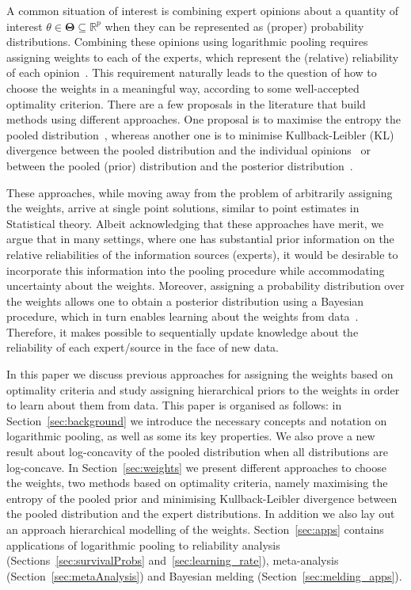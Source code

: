 \documentclass[a4paper, notitlepage, 10pt]{article}
\begin{document}
A common situation of interest is combining expert opinions about a quantity of interest $\theta \in \mathbf{\Theta} \subseteq \mathbb{R}^p$ when they can be represented as (proper) probability distributions.
Combining these opinions using logarithmic pooling requires assigning weights to each of the experts, which represent the (relative) reliability of each opinion~\citep{Genest1984}.
This requirement naturally leads to the question of how to choose the weights in a meaningful way, according to some well-accepted optimality criterion.
There are a few proposals in the literature that build methods using different approaches.
One proposal is to maximise the entropy the pooled distribution~\citep{Myung1996}, whereas another one is to minimise Kullback-Leibler (KL) divergence between the pooled distribution and the individual opinions~\citep{Abbas2009} or between the pooled (prior) distribution and the posterior distribution~\citep{Rufo2012A,Rufo2012B}.

These approaches, while moving away from the problem of arbitrarily assigning the weights, arrive at single point solutions, similar to point estimates in Statistical theory.
Albeit acknowledging that these approaches have merit, we argue that in many settings, where one has substantial prior information on the relative reliabilities of the information sources (experts), it would be desirable to incorporate this information into the pooling procedure while accommodating uncertainty about the weights.
Moreover, assigning a probability distribution over the weights allows one to obtain a posterior distribution using a Bayesian procedure, which in turn enables learning about the weights from data~\citep{Poole2000}.
Therefore, it makes possible to sequentially update knowledge about the reliability of each expert/source in the face of new data.

In this paper we discuss previous approaches for assigning the weights based on optimality criteria and study assigning hierarchical priors to the weights in order to learn about them from data.
This paper is organised as follows: in Section~\ref{sec:background} we introduce the necessary concepts and notation on logarithmic pooling, as well as some its key properties.
We also prove a new result about log-concavity of the pooled distribution when all distributions are log-concave.
In Section~\ref{sec:weights} we present different approaches to choose the weights, two methods based on optimality criteria, namely maximising the entropy of the pooled prior and minimising Kullback-Leibler divergence between the pooled distribution and the expert distributions.
In addition we also lay out an approach hierarchical modelling of the weights.
Section~\ref{sec:apps} contains applications of logarithmic pooling to reliability analysis (Sections~\ref{sec:survivalProbs} and~\ref{sec:learning_rate}), meta-analysis (Section~\ref{sec:metaAnalysis}) and Bayesian melding (Section~\ref{sec:melding_apps}).
\end{document}
